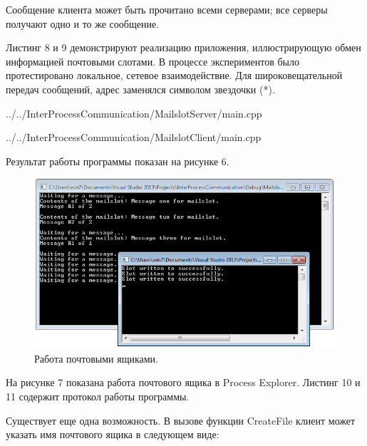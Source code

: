\documentclass[a4paper, 12pt]{report}		%
\begin{document}
Сообщение клиента может быть прочитано всеми серверами; все серверы получают одно и то же сообщение.

Листинг 8 и 9 демонстрируют реализацию приложения, иллюстрирующую обмен информацией почтовыми слотами. В процессе экспериментов было протестировано локальное, сетевое взаимодействие. Для широковещательной передач сообщений, адрес заменялся символом звездочки (*).


{../../InterProcessCommunication/MailslotServer/main.cpp}

\vspace{3em}


{../../InterProcessCommunication/MailslotClient/main.cpp}

Результат работы программы показан на рисунке 6.

\begin{figure}[h!]
\centering
\includegraphics[scale=0.95]{res/06_MailSlot}
\caption{Работа почтовыми ящиками.}
\end{figure}

На рисунке 7 показана работа почтового ящика в Process Explorer. Листинг 10 и 11 содержит протокол работы программы.





Существует еще одна возможность. В вызове функции CreateFile клиент может указать имя почтового ящика в следующем виде:
\end{document}
